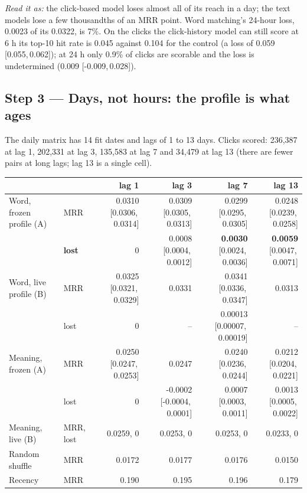 \documentclass[11pt,a4paper]{article}
\newcommand{\ci}[2]{[#1,\,#2]}
\begin{document}
\textit{Read it as:} the click-based model loses almost all of its reach in a day; the text models lose a few thousandths of an MRR point. Word matching's 24-hour loss, 0.0023 of its 0.0322, is 7\%. On the clicks the click-history model can still score at 6 h its top-10 hit rate is 0.045 against 0.104 for the control (a loss of 0.059 \ci{0.055}{0.062}); at 24 h only 0.9\% of clicks are scorable and the loss is undetermined (0.009 \ci{-0.009}{0.028}).

\subsection{Step 3 --- Days, not hours: the profile is what ages}
The daily matrix has 14 fit dates and lags of 1 to 13 days. Clicks scored: 236,387 at lag 1, 202,331 at lag 3, 135,583 at lag 7 and 34,479 at lag 13 (there are fewer pairs at long lags; lag 13 is a single cell).
\begin{center}\scriptsize
\setlength{\tabcolsep}{3pt}
\begin{tabular}{@{}llrrrr@{}}
\toprule
 & & lag 1 & lag 3 & lag 7 & lag 13\\
\midrule
Word, frozen profile (A) & MRR & 0.0310 \ci{0.0306}{0.0314} & 0.0309 \ci{0.0305}{0.0313} & 0.0299 \ci{0.0295}{0.0305} & 0.0248 \ci{0.0239}{0.0258}\\
\rowcolor{green!12} & \textbf{lost} & 0 & 0.0008 \ci{0.0004}{0.0012} & \textbf{0.0030} \ci{0.0024}{0.0036} & \textbf{0.0059} \ci{0.0047}{0.0071}\\
Word, live profile (B) & MRR & 0.0325 \ci{0.0321}{0.0329} & 0.0331 & 0.0341 \ci{0.0336}{0.0347} & 0.0313\\
 & lost & 0 & -- & 0.00013 \ci{0.00007}{0.00019} & --\\
Meaning, frozen (A) & MRR & 0.0250 \ci{0.0247}{0.0253} & 0.0247 & 0.0240 \ci{0.0236}{0.0244} & 0.0212 \ci{0.0204}{0.0221}\\
 & lost & 0 & -0.0002 \ci{-0.0004}{0.0001} & 0.0007 \ci{0.0003}{0.0011} & 0.0013 \ci{0.0005}{0.0022}\\
Meaning, live (B) & MRR, lost & 0.0259, 0 & 0.0253, 0 & 0.0253, 0 & 0.0233, 0\\
Random shuffle & MRR & 0.0172 & 0.0177 & 0.0176 & 0.0150\\
Recency & MRR & 0.190 & 0.195 & 0.196 & 0.179\\
\bottomrule
\end{tabular}
\end{center}
\end{document}
